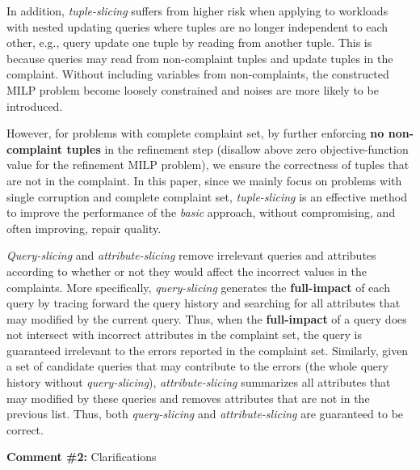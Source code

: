 In addition, \emph{tuple-slicing} suffers from higher risk when applying to workloads 
with nested updating queries where tuples are no longer independent to each other, 
e.g., query update one tuple by reading from another tuple. This is because queries 
may read from non-complaint tuples and update tuples in the complaint. Without including 
variables from non-complaints, the constructed MILP problem become loosely constrained 
and noises are more likely to be introduced. 
 
However, for problems with complete complaint set, by further enforcing \textbf{no non-complaint tuples}
 in the refinement step (disallow above zero objective-function value for the refinement MILP problem), 
 we ensure the correctness of tuples that are not in the complaint. In this paper, since we 
 mainly focus on problems with single corruption and complete complaint set, 
 \emph{tuple-slicing} is an effective method to improve the performance of the \emph{basic} 
 approach, without compromising, and often improving, repair quality.  
 
\emph{Query-slicing} and \emph{attribute-slicing} remove irrelevant queries and attributes 
according to whether or not they would affect the incorrect values in the complaints. More specifically,
\emph{query-slicing} generates the \textbf{full-impact} of each query by tracing forward the 
query history and searching for all attributes that may modified by the current query. Thus, 
when the \textbf{full-impact} of a query does not intersect with incorrect attributes in the 
complaint set, the query is guaranteed irrelevant to the errors reported in the complaint set. 
Similarly, given a set of candidate queries that may contribute to the errors (the whole
query history without \emph{query-slicing}), \emph{attribute-slicing} summarizes all attributes 
that may modified by these queries and removes attributes that are not in the previous list.
Thus, both \emph{query-slicing} and \emph{attribute-slicing} are guaranteed to be correct. 
 
\comskip

\noindent
\textbf{Comment \#2:} Clarifications
\begin{quote}
\end{quote}

